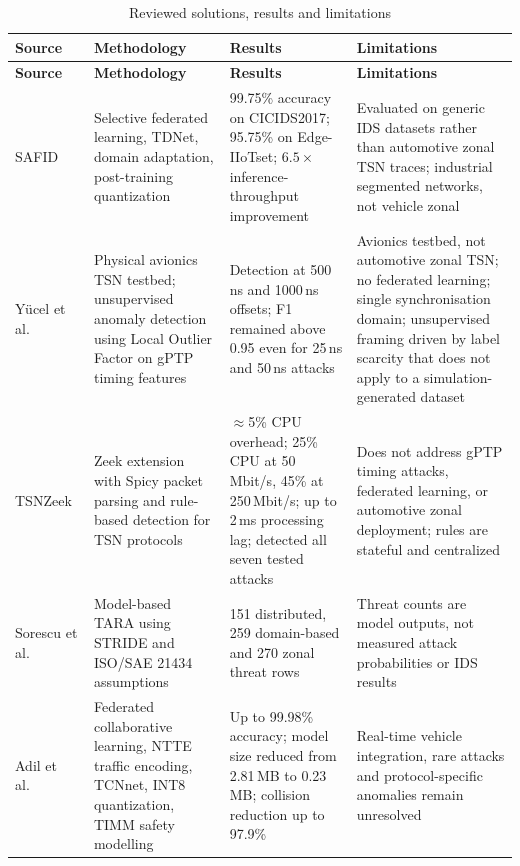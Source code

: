 \begin{longtable}{p{} p{} p{} p{}}
\caption{Reviewed solutions, results and limitations}\\
\toprule
\textbf{Source} & \textbf{Methodology} & \textbf{Results} & \textbf{Limitations} \\
\midrule
\endfirsthead
\toprule
\textbf{Source} & \textbf{Methodology} & \textbf{Results} & \textbf{Limitations} \\
\midrule
\endhead
SAFID~\cite{adil2026safid} &
Selective federated learning, TDNet, domain adaptation, post-training quantization &
99.75\% accuracy on CICIDS2017; 95.75\% on Edge-IIoTset; $6.5\times$
inference-throughput improvement &
Evaluated on generic IDS datasets rather than automotive zonal TSN traces;
industrial segmented networks, not vehicle zonal \\
\addlinespace
Y\"ucel et al.~\cite{yucel2026icns} &
Physical avionics TSN testbed; unsupervised anomaly detection using Local Outlier
Factor on gPTP timing features &
Detection at 500\,ns and 1000\,ns offsets; F1 remained above 0.95 even for 25\,ns and
50\,ns attacks &
Avionics testbed, not automotive zonal TSN; no federated learning; single
synchronisation domain; unsupervised framing driven by label scarcity that does not
apply to a simulation-generated dataset \\
\addlinespace
TSNZeek~\cite{ergenc2023tsnzeek} &
Zeek extension with Spicy packet parsing and rule-based detection for TSN protocols &
$\approx$5\% CPU overhead; 25\% CPU at 50\,Mbit/s, 45\% at 250\,Mbit/s; up to 2\,ms
processing lag; detected all seven tested attacks &
Does not address gPTP timing attacks, federated learning, or automotive zonal
deployment; rules are stateful and centralized \\
\addlinespace
Sorescu et al.~\cite{sorescu2026ota} &
Model-based TARA using STRIDE and ISO/SAE 21434 assumptions &
151 distributed, 259 domain-based and 270 zonal threat rows &
Threat counts are model outputs, not measured attack probabilities or IDS results \\
\addlinespace
Adil et al.~\cite{adil2026embedded} &
Federated collaborative learning, NTTE traffic encoding, TCNnet, INT8 quantization,
TIMM safety modelling &
Up to 99.98\% accuracy; model size reduced from 2.81\,MB to 0.23\,MB; collision
reduction up to 97.9\% &
Real-time vehicle integration, rare attacks and protocol-specific anomalies remain
unresolved \\
\bottomrule
\end{longtable}

